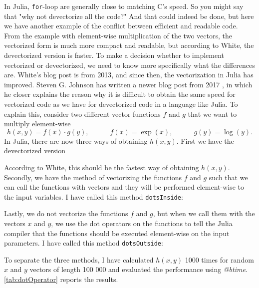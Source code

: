 In Julia, \texttt{for}-loop are generally close to matching C's speed. So you might say that "why not devectorize all the code?" And that could indeed be done, but here we have another example of the conflict between efficient and readable code. From the example with element-wise multiplication of the two vectors, the vectorized form is much more compact and readable, but according to White, the devectorized version is faster. To make a decision whether to implement vectorized or devectorized, we need to know more specifically what the differences are. White's blog post is from 2013, and since then, the vectorization in Julia has improved. Steven G. Johnson has written a newer blog post from 2017 \emph{\citep{MoreDotsJuliaBlog}}, in which he closer explains the reason why it is difficult to obtain the same speed for vectorized code as we have for devectorized code in a language like Julia. To explain this, consider two different vector functions $f$ and $g$ that we want to multiply element-wise
\begin{equation*}
    h(x,y) = f(x) \cdot g(y), \hspace{3em} f(x) = \exp(x), \hspace{3em} g(y) = \log(y).
\end{equation*}
In Julia, there are now three ways of obtaining $h(x,y)$. First we have the devectorized version 

According to White, this should be the fastest way of obtaining $h(x,y)$. Secondly, we have the method of vectorizing the functions $f$ and $g$ such that we can call the functions with vectors and they will be performed element-wise to the input variables. I have called this method \texttt{dotsInside}:

Lastly, we do not vectorize the functions $f$ and $g$, but when we call them with the vectors $x$ and $y$, we use the dot operators on the functions to tell the Julia compiler that the functions should be executed element-wise on the input parameters. I have called this method \texttt{dotsOutside}:

To separate the three methods, I have calculated $h(x,y)$ 1000 times for random $x$ and $y$ vectors of length 100 000 and evaluated the performance using \textit{@btime}. \autoref{tab:dotOperator} reports the results.

